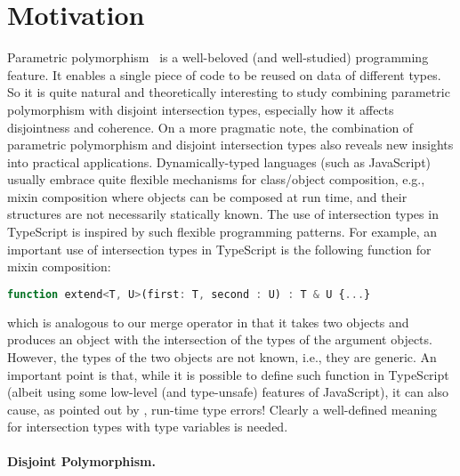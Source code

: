 
\section{Motivation}
\label{sec:poly:motivation}

Parametric polymorphism~\citep{reynolds1983types} is a well-beloved (and
well-studied) programming feature. It enables a single piece of code to be
reused on data of different types. So it is quite natural and theoretically
interesting to study combining parametric polymorphism with disjoint
intersection types, especially how it affects disjointness and coherence. On a
more pragmatic note, the combination of parametric polymorphism and disjoint
intersection types also reveals new insights into practical applications.
Dynamically-typed languages (such as JavaScript) usually embrace quite flexible
mechanisms for class/object composition, e.g., mixin composition where objects
can be composed at run time, and their structures are not necessarily statically
known. The use of intersection types in TypeScript is inspired by such flexible
programming patterns. For example, an important use of intersection types in
TypeScript is the following function for mixin composition:
\begin{lstlisting}[language=JavaScript]
function extend<T, U>(first: T, second : U) : T & U {...}
\end{lstlisting}
which is analogous to our merge operator in that it takes two objects and
produces an object with the intersection of the types of the argument objects.
However, the types of the two objects are not known, i.e., they are generic. An
important point is that, while it is possible to define such function in
TypeScript (albeit using some low-level (and type-unsafe) features of
JavaScript), it can also cause, as pointed out by \citet{alpuimdisjoint},
run-time type errors! Clearly a well-defined meaning for intersection types with
type variables is needed.


\paragraph{Disjoint Polymorphism.}

